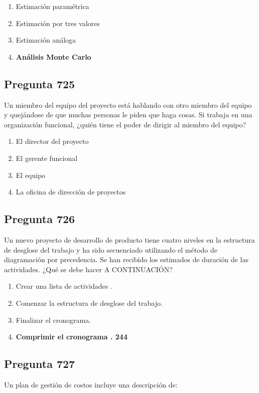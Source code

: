 \documentclass[11pt,a4paper]{article}
\begin{document}
\begin{enumerate}[label=\alph*)]
  \item Estimación paramétrica
  \item Estimación por tres valores
  \item Estimación análoga
  \item \textbf{Análisis Monte Carlo}
\end{enumerate}

\subsection*{Pregunta 725}
Un miembro del equipo del proyecto está hablando con otro miembro del equipo y quejándose de que muchas personas le piden que haga cosas. Si trabaja en una organización funcional, ¿quién tiene el poder de dirigir al miembro del equipo?

\begin{enumerate}[label=\alph*)]
  \item El director del proyecto
  \item El gerente funcional
  \item El equipo
  \item La oficina de dirección de proyectos
\end{enumerate}

\subsection*{Pregunta 726}
Un nuevo proyecto de desarrollo de producto tiene cuatro niveles en la estructura de desglose del trabajo y ha sido secuenciado utilizando el método de diagramación por precedencia. Se han recibido los estimados de duración de las actividades. ¿Qué se debe hacer A CONTINUACIÓN?

\begin{enumerate}[label=\alph*)]
  \item Crear una lista de actividades .
  \item Comenzar la estructura de desglose del trabajo.
  \item Finalizar el cronograma.
  \item \textbf{Comprimir el cronograma . 244}
\end{enumerate}

\subsection*{Pregunta 727}
Un plan de gestión de costos incluye una descripción de:
\end{document}

